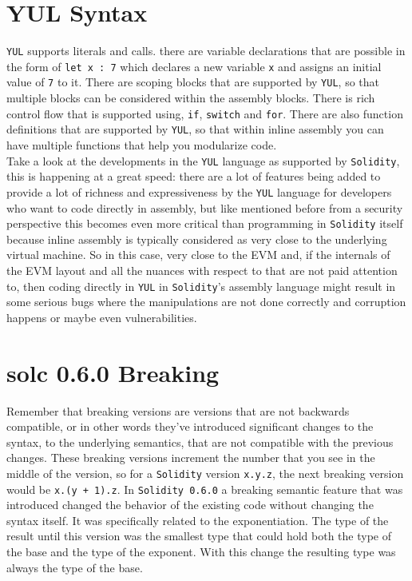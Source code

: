 \section{YUL Syntax}
\verb|YUL| supports literals and calls. there are variable declarations that are possible in the form of \verb|let x : 7| which declares a new variable \verb|x| and assigns an initial value of \verb|7| to it. There are scoping blocks that are supported by \verb|YUL|, so that multiple blocks can be considered within the assembly blocks. There is rich control flow that is supported using, \verb|if|, \verb|switch| and \verb|for|. There are also function definitions that are supported by \verb|YUL|, so that within inline assembly you can have multiple functions that help you modularize code.\\

Take a look at the developments in the \verb|YUL| language as supported by \verb|Solidity|, this is happening at a great speed: there are a lot of features being added to provide a lot of richness and expressiveness by the \verb|YUL| language for developers who want to code directly in assembly, but like mentioned before from a security perspective this becomes even more critical than programming in \verb|Solidity| itself because inline assembly is typically considered as very close to the underlying virtual machine. So in this case, very close to the EVM and, if the internals of the EVM layout and all the nuances with respect to that are not paid attention to, then coding directly in \verb|YUL| in \verb|Solidity|'s assembly language might result in some serious bugs where the manipulations are not done correctly and corruption happens or maybe even vulnerabilities.

\section{solc 0.6.0 Breaking}
Remember that breaking versions are versions that are not backwards compatible, or in other words they've introduced significant changes to the syntax, to the underlying semantics, that are not compatible with the previous changes. These breaking versions increment the number that you see in the middle of the version, so for a \verb|Solidity| version \verb|x.y.z|, the next breaking version would be \verb|x.(y + 1).z|. In \verb|Solidity 0.6.0| a breaking semantic feature that was introduced changed the behavior of the existing code without changing the syntax itself. It was specifically related to the exponentiation. The type of the result until this version was the smallest type that could hold both the type of the base and the type of the exponent. With this change the resulting type was always the type of the base.

